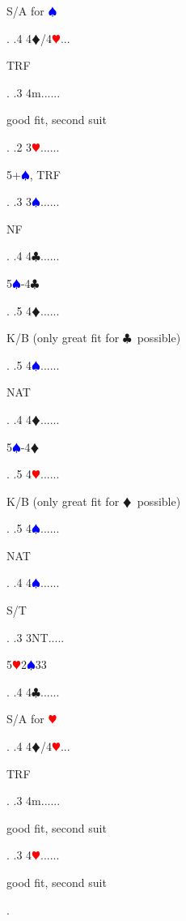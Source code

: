 \documentclass[a4paper]{article}
\newcommand{\BC}{\textcolor{OliveGreen}{$\clubsuit$}}
\newcommand{\BD}{\textcolor{RedOrange}{$\vardiamondsuit$}}
\newcommand{\BH}{\textcolor{Red}{$\varheartsuit${}}}
\newcommand{\BS}{\textcolor{Blue}{$\spadesuit${}}}
\begin{document}
{\begin{minipage}[t]{0.8\textwidth}
S/A for \BS 
\end{minipage}. 
 .4 4\BD/4\BH...\begin{minipage}[t]{0.8\textwidth}
TRF
\end{minipage}. 
 .3 4m......\begin{minipage}[t]{0.8\textwidth}
good fit, second suit
\end{minipage}. 
 .2 3\BH......\begin{minipage}[t]{0.8\textwidth}
5+\BS , TRF
\end{minipage}. 
 .3 3\BS......\begin{minipage}[t]{0.8\textwidth}
NF
\end{minipage}. 
 .4 4\BC......\begin{minipage}[t]{0.8\textwidth}
5\BS -4\BC 
\end{minipage}. 
 .5 4\BD......\begin{minipage}[t]{0.8\textwidth}
K/B (only great fit for \BC\ possible)
\end{minipage}. 
 .5 4\BS......\begin{minipage}[t]{0.8\textwidth}
NAT
\end{minipage}. 
 .4 4\BD......\begin{minipage}[t]{0.8\textwidth}
5\BS -4\BD 
\end{minipage}. 
 .5 4\BH......\begin{minipage}[t]{0.8\textwidth}
K/B (only great fit for \BD\ possible)
\end{minipage}. 
 .5 4\BS......\begin{minipage}[t]{0.8\textwidth}
NAT
\end{minipage}. 
 .4 4\BS......\begin{minipage}[t]{0.8\textwidth}
S/T
\end{minipage}. 
 .3 3NT.....\begin{minipage}[t]{0.8\textwidth}
5\BH 2\BS 33
\end{minipage}. 
 .4 4\BC......\begin{minipage}[t]{0.8\textwidth}
S/A for \BH 
\end{minipage}. 
 .4 4\BD/4\BH...\begin{minipage}[t]{0.8\textwidth}
TRF
\end{minipage}. 
 .3 4m......\begin{minipage}[t]{0.8\textwidth}
good fit, second suit
\end{minipage}. 
 .3 4\BH......\begin{minipage}[t]{0.8\textwidth}
good fit, second suit
\end{minipage}. 
}
\end{document}
